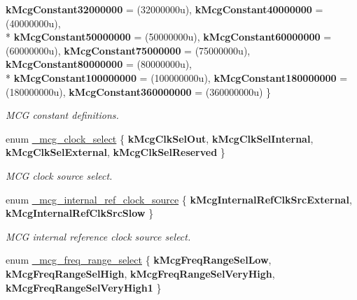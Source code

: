\begin{DoxyCompactItemize}
{\bfseries k\+Mcg\+Constant32000000} = (32000000u), 
{\bfseries k\+Mcg\+Constant40000000} = (40000000u), 
\\*
{\bfseries k\+Mcg\+Constant50000000} = (50000000u), 
{\bfseries k\+Mcg\+Constant60000000} = (60000000u), 
{\bfseries k\+Mcg\+Constant75000000} = (75000000u), 
{\bfseries k\+Mcg\+Constant80000000} = (80000000u), 
\\*
{\bfseries k\+Mcg\+Constant100000000} = (100000000u), 
{\bfseries k\+Mcg\+Constant180000000} = (180000000u), 
{\bfseries k\+Mcg\+Constant360000000} = (360000000u)
 \}\hypertarget{group__mcg__hal_gaadd12e80f98bc09e584342e08503ba56}{}\label{group__mcg__hal_gaadd12e80f98bc09e584342e08503ba56}
\begin{DoxyCompactList}\small\item\em M\+CG constant definitions. \end{DoxyCompactList}
\item 
enum \hyperlink{group__mcg__hal_ga47d0604aecdca071e276eaf3ce1cb9bf}{\+\_\+mcg\+\_\+clock\+\_\+select} \{ {\bfseries k\+Mcg\+Clk\+Sel\+Out}, 
{\bfseries k\+Mcg\+Clk\+Sel\+Internal}, 
{\bfseries k\+Mcg\+Clk\+Sel\+External}, 
{\bfseries k\+Mcg\+Clk\+Sel\+Reserved}
 \}\hypertarget{group__mcg__hal_ga47d0604aecdca071e276eaf3ce1cb9bf}{}\label{group__mcg__hal_ga47d0604aecdca071e276eaf3ce1cb9bf}
\begin{DoxyCompactList}\small\item\em M\+CG clock source select. \end{DoxyCompactList}
\item 
enum \hyperlink{group__mcg__hal_gaef0cd9fa7c07747ebc03669ab129bc70}{\+\_\+mcg\+\_\+internal\+\_\+ref\+\_\+clock\+\_\+source} \{ {\bfseries k\+Mcg\+Internal\+Ref\+Clk\+Src\+External}, 
{\bfseries k\+Mcg\+Internal\+Ref\+Clk\+Src\+Slow}
 \}\hypertarget{group__mcg__hal_gaef0cd9fa7c07747ebc03669ab129bc70}{}\label{group__mcg__hal_gaef0cd9fa7c07747ebc03669ab129bc70}
\begin{DoxyCompactList}\small\item\em M\+CG internal reference clock source select. \end{DoxyCompactList}
\item 
enum \hyperlink{group__mcg__hal_ga56b8270f800b5d5bf01cfcfbe31e92c4}{\+\_\+mcg\+\_\+freq\+\_\+range\+\_\+select} \{ {\bfseries k\+Mcg\+Freq\+Range\+Sel\+Low}, 
{\bfseries k\+Mcg\+Freq\+Range\+Sel\+High}, 
{\bfseries k\+Mcg\+Freq\+Range\+Sel\+Very\+High}, 
{\bfseries k\+Mcg\+Freq\+Range\+Sel\+Very\+High1}
 \}\hypertarget{group__mcg__hal_ga56b8270f800b5d5bf01cfcfbe31e92c4}{}\label{group__mcg__hal_ga56b8270f800b5d5bf01cfcfbe31e92c4}

\end{DoxyCompactItemize}
